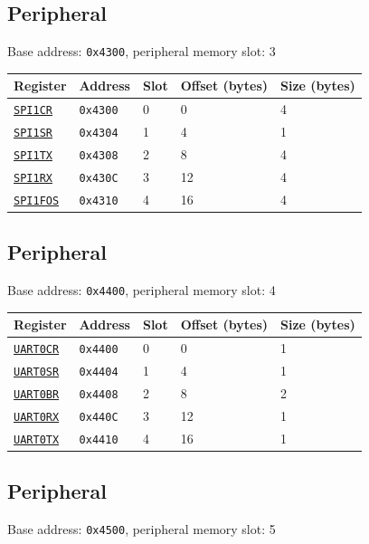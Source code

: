 \subsection{ Peripheral}
\noindent Base address: \texttt{0x4300}, peripheral memory slot: 3

\begin{tabularx}{\textwidth}{ l l l l X }
\textbf{Register} & \textbf{Address} & \textbf{Slot} & \textbf{Offset (bytes)} & \textbf{Size (bytes)} \\ \hline
\hyperref[ss:SPIxCR]{\texttt{SPI1CR}} & \texttt{0x4300} & 0 & 0 & 4 \\
\rowcolor{tablehighlightcolor} \hyperref[ss:SPIxSR]{\texttt{SPI1SR}} & \texttt{0x4304} & 1 & 4 & 1 \\
\hyperref[ss:SPIxTX]{\texttt{SPI1TX}} & \texttt{0x4308} & 2 & 8 & 4 \\
\rowcolor{tablehighlightcolor} \hyperref[ss:SPIxRX]{\texttt{SPI1RX}} & \texttt{0x430C} & 3 & 12 & 4 \\
\hyperref[ss:SPIxFOS]{\texttt{SPI1FOS}} & \texttt{0x4310} & 4 & 16 & 4 \\
\hline
\end{tabularx}

\subsection{ Peripheral}
\noindent Base address: \texttt{0x4400}, peripheral memory slot: 4

\begin{tabularx}{\textwidth}{ l l l l X }
\textbf{Register} & \textbf{Address} & \textbf{Slot} & \textbf{Offset (bytes)} & \textbf{Size (bytes)} \\ \hline
\hyperref[ss:UARTxCR]{\texttt{UART0CR}} & \texttt{0x4400} & 0 & 0 & 1 \\
\rowcolor{tablehighlightcolor} \hyperref[ss:UARTxSR]{\texttt{UART0SR}} & \texttt{0x4404} & 1 & 4 & 1 \\
\hyperref[ss:UARTxBR]{\texttt{UART0BR}} & \texttt{0x4408} & 2 & 8 & 2 \\
\rowcolor{tablehighlightcolor} \hyperref[ss:UARTxRX]{\texttt{UART0RX}} & \texttt{0x440C} & 3 & 12 & 1 \\
\hyperref[ss:UARTxTX]{\texttt{UART0TX}} & \texttt{0x4410} & 4 & 16 & 1 \\
\hline
\end{tabularx}

\subsection{ Peripheral}
\noindent Base address: \texttt{0x4500}, peripheral memory slot: 5

